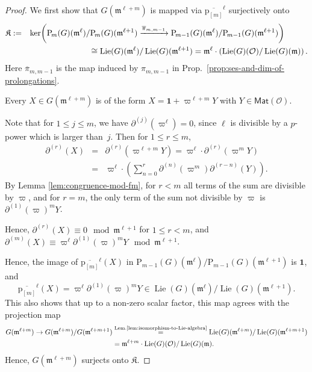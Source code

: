 \documentclass[10pt,a4paper]{amsart}
\theoremstyle{plain} %
\theoremstyle{definition}
\theoremstyle{remark}
\newcommand{\cO}{\mathcal{O}}   %
\newcommand{\fm}{\mathfrak{m}}  %
\newcommand{\fK}{\mathfrak{K}}
\newcommand{\rP}[1]{\mathrm{P}_{\!#1}}
\newcommand{\Mat}{\mathsf{Mat}}
\newcommand{\Lie}{\operatorname{Lie}}
\newcommand{\hd}[2]{\partial^{(#1)}\!\!\left(#2\right)} %
\newcommand{\prol}[1]{\mathrm{p}_{[#1]}}
\numberwithin{equation}{subsection}
\begin{document}
\begin{proof}
We first show that $G(\fm^{\ell+m})$ is mapped via $\overline{\prol{m}}^\ell$ surjectively onto 
\begin{eqnarray*}
\fK & := & \ker\biggl(\rP{m}(G)(\fm^\ell)/\rP{m}(G)(\fm^{\ell+1})\xrightarrow{\overline{\pi}_{m,m-1}} \rP{{}m-1}(G)(\fm^\ell)/\rP{{}m-1}(G)(\fm^{\ell+1})\biggr)\hspace*{1cm}\\
 &&\hspace*{2cm} \cong
\Lie(G)(\fm^\ell)/\Lie(G)(\fm^{\ell+1})= \fm^\ell \cdot \left( \Lie(G)(\cO)/\Lie(G)(\fm)\right).
\end{eqnarray*}
Here $\overline{\pi}_{m,m-1}$ is the map induced by $\pi_{m,m-1}$ in Prop.~\ref{prop:ses-and-dim-of-prolongations}.

Every $X \in G(\fm^{\ell+m})$ is of the form $X=\mathbf{1}+\varpi^{\ell+m}Y$ with $Y\in \Mat(\cO)$. 

Note that for $1 \leq j \leq m$, we have $\hd{j}{\varpi^\ell}=0$, since $\ell$ is divisible by a $p$-power which is larger than~$j$. Then for $1 \leq r \leq m$,
\begin{eqnarray*}
\hd{r}{X} &=& \hd{r}{\varpi^{\ell+m}Y} = \varpi^{\ell} \cdot \hd{r}{\varpi^mY}\\
&=& \varpi^{\ell} \cdot \left( \sum_{n=0}^r \hd{n}{\varpi^m} \hd{r-n}{Y} \right). 
\end{eqnarray*}
By Lemma \ref{lem:congruence-mod-fm}, for $r<m$ all terms of the sum are divisible by $\varpi$, and for $r=m$,
the only term of the sum not divisible by $\varpi$ is $\hd{1}{\varpi}^mY$. 

Hence, $\hd{r}{X}\equiv 0 \mod \fm^{\ell+1}$ for $1\leq r<m$, and $\hd{m}{X}\equiv \varpi^{\ell} \hd{1}{\varpi}^mY\mod \fm^{\ell+1}$.

Hence, the image of $\overline{\prol{m}}^\ell(X)$ in $\rP{{}m-1}(G)(\fm^\ell)/\rP{{}m-1}(G)(\fm^{\ell+1})$ is $\mathbf{1}$, and
\[\overline{\prol{m}}^\ell(X)= \varpi^{\ell} \hd{1}{\varpi}^mY\in \Lie(G)(\fm^\ell)/\Lie(G)(\fm^{\ell+1}).\]
This also shows that up to a non-zero scalar factor, this map agrees with the projection map
\begin{align*}
G(\fm^{\ell+m})\to G(\fm^{\ell+m})/G(\fm^{\ell+m+1}) &\stackrel{\text{Lem.\ref{lem:isomorphism-to-Lie-algebra}}}{=}\Lie(G)(\fm^{\ell+m})/\Lie(G)(\fm^{\ell+m+1}) \\
& = \fm^{\ell+m} \cdot \Lie(G)(\cO)/\Lie(G)(\fm).
\end{align*} 
Hence, $G(\fm^{\ell+m})$ surjects onto $\fK$.


\end{proof}
\end{document}
